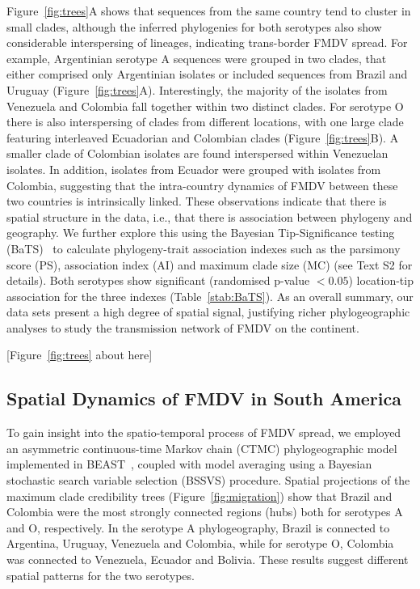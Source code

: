 \documentclass[10pt]{article}
\begin{document}
Figure~\ref{fig:trees}A shows that sequences from the same country tend to cluster in small clades, although the inferred phylogenies for both serotypes also show considerable interspersing of lineages, indicating trans-border FMDV spread.
For example, Argentinian serotype A sequences were grouped in two clades, that either comprised only Argentinian isolates or included sequences from Brazil and Uruguay (Figure~\ref{fig:trees}A).
Interestingly, the majority of the isolates from Venezuela and Colombia fall together within two distinct clades.
For serotype O there is also interspersing of clades from different locations, with one large clade featuring interleaved Ecuadorian and Colombian clades (Figure~\ref{fig:trees}B).
A smaller clade of Colombian isolates are found interspersed within Venezuelan isolates.
In addition, isolates from Ecuador were grouped with isolates from Colombia, suggesting that the intra-country dynamics of FMDV between these two countries is intrinsically linked.
These observations indicate that there is spatial structure in the data, i.e., that there is association between phylogeny and geography.
We further explore this using the Bayesian Tip-Significance testing (BaTS)~\cite{bats} to calculate phylogeny-trait association indexes such as the parsimony score (PS), association index (AI) and maximum clade size (MC) (see Text S2 for details).
Both serotypes show significant (randomised p-value $< 0.05$) location-tip association for the three indexes (Table~\ref{stab:BaTS}).
As an overall summary, our data sets present a high degree of spatial signal, justifying richer phylogeographic analyses to study the transmission network of FMDV on the continent.

\begin{center}
 [Figure~\ref{fig:trees} about here]
\end{center}

\subsection*{Spatial Dynamics of FMDV in South America}

To gain insight into the spatio-temporal process of FMDV spread, we employed an asymmetric continuous-time Markov chain (CTMC) phylogeographic model~\cite{roots} implemented in BEAST~\cite{beast2012}, coupled with model averaging using a Bayesian stochastic search variable selection (BSSVS) procedure.
Spatial projections of the maximum clade credibility trees (Figure~\ref{fig:migration}) show that Brazil and Colombia were the most strongly connected regions (hubs) both for serotypes A and O, respectively. 
In the serotype A phylogeography, Brazil is connected to Argentina, Uruguay, Venezuela and Colombia, while for serotype O, Colombia was connected to Venezuela, Ecuador and Bolivia.
These results suggest different spatial patterns for the two serotypes.
\end{document}
